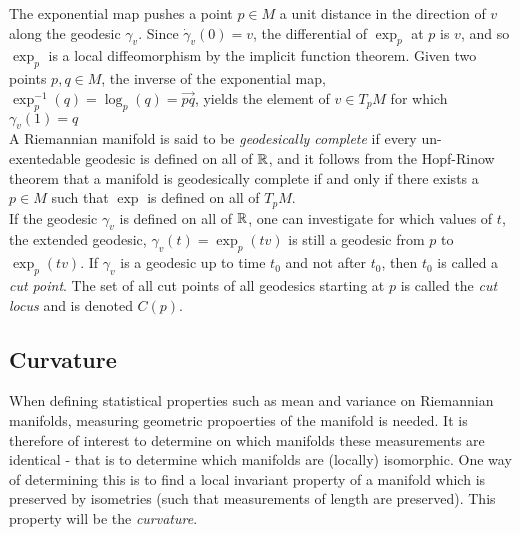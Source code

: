 The exponential map pushes a point $p \in M$ a unit distance in the direction of $v$ along the geodesic $\gamma_v$. Since $\dot{\gamma}_v(0) = v$, the differential of $\exp_p$ at $p$ is $v$, and so $\exp_p$ is a local diffeomorphism by the implicit function theorem. Given two points $p,q \in M$, the inverse of the exponential map, $\exp_p^{-1}(q) = \log_p(q) = \overrightarrow{pq}$, yields the element of $v \in T_p M$ for which $\gamma_v (1) = q$ \\[0.2 cm]
A Riemannian manifold is said to be \textit{geodesically complete} if every un-exentedable geodesic is defined on all of $\mathbb{R}$, and it follows from the Hopf-Rinow theorem that a manifold is geodesically complete if and only if there exists a $p \in M$ such that $\exp$ is defined on all of $T_p M$.\\[0.2 cm]
If the geodesic $\gamma_v$ is defined on all of $\mathbb{R}$, one can investigate for which values of $t$, the extended geodesic, $\gamma_v(t) = \exp_p (t v)$ is still a geodesic from $p$ to $\exp_p (t v)$. If $\gamma_v$ is a geodesic up to time $t_0$ and not after $t_0$, then $t_0$ is called a \textit{cut point}. The set of all cut points of all geodesics starting at $p$ is called the \textit{cut locus} and is denoted $C(p)$.

\subsection{Curvature}

When defining statistical properties such as mean and variance on Riemannian manifolds, measuring geometric propoerties of the manifold is needed. It is therefore of interest to determine on which manifolds these measurements are identical - that is to determine which manifolds are (locally) isomorphic. One way of determining this is to find a local invariant property of a manifold which is preserved by isometries (such that measurements of length are preserved). This property will be the \textit{curvature}.

